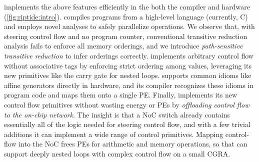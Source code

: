 \riptide implements the above features efficiently in the both
the compiler and hardware (\autoref{fig:riptide:intro}).
%
\riptide compiles programs from a high-level language (currently, C) and
employs novel analyses to safely parallelize operations.
%
We observe that, with steering control flow and no program counter,
conventional transitive reduction analysis fails to enforce all memory
orderings, and we introduce \emph{path-sensitive transitive reduction}
to infer orderings correctly.
%
\riptide implements arbitrary control flow without associative tags
by enforcing strict ordering among values,
leveraging its new primitives like the carry gate for nested loops.
%
\riptide supports common idioms like affine generators directly in hardware,
%
and its compiler recognizes these idioms in program code
and maps them onto a single PE.
%
Finally, \riptide implements its new control flow primitives without wasting energy
or PEs by \emph{offloading control flow to the on-chip network}.
%
The insight is that a NoC switch already contains essentially all of
the logic needed for steering control flow, and with a few
trivial additions it can implement a wide range of control primitives.
%
Mapping control-flow into the NoC frees PEs for arithmetic and memory
operations, so that \riptide can support deeply nested loops with complex
control flow on a small CGRA.
%

